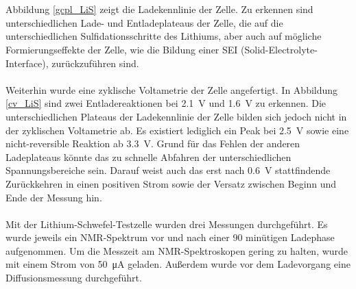 \documentclass[a4paper, 11pt, headsepline,footsepline,twoside,abstract]{scrbook}
\begin{document}
\\\\
Abbildung \ref{gcpl_LiS} zeigt die Ladekennlinie der Zelle. Zu erkennen sind unterschiedlichen Lade- und Entladeplateaus der Zelle, die auf die unterschiedlichen Sulfidationsschritte des Lithiums, aber auch auf mögliche Formierungseffekte der Zelle, wie die Bildung einer SEI (Solid-Electrolyte-Interface), zurückzuführen sind.
\\\\
Weiterhin wurde eine zyklische Voltametrie der Zelle angefertigt. In Abbildung \ref{cv_LiS} sind zwei Entladereaktionen bei \SI{2.1}{\volt} und \SI{1.6}{\volt} zu erkennen. Die unterschiedlichen Plateaus der Ladekennlinie der Zelle bilden sich jedoch nicht in der zyklischen Voltametrie ab. Es existiert lediglich ein Peak bei \SI{2,5}{\volt} sowie eine nicht-reversible Reaktion ab \SI{3.3}{\volt}. Grund für das Fehlen der anderen Ladeplateaus könnte das zu schnelle Abfahren der unterschiedlichen Spannungsbereiche sein. Darauf weist auch das erst nach \SI{0.6}{\volt} stattfindende Zurückkehren in einen positiven Strom sowie der Versatz zwischen Beginn und Ende der Messung hin. 
\\\\
Mit der Lithium-Schwefel-Testzelle wurden drei Messungen durchgeführt. Es wurde jeweils ein NMR-Spektrum vor und nach einer 90 minütigen Ladephase aufgenommen. Um die Messzeit am NMR-Spektroskopen gering zu halten, wurde mit einem Strom von \SI{50}{\micro\ampere} geladen. Außerdem wurde vor dem Ladevorgang eine Diffusionsmessung durchgeführt.
\end{document}
